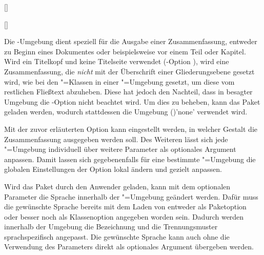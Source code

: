 \begin{Declaration*}{}
\begin{Declaration*}{}
\begin{Declaration*}{}
\begin{Declaration}{[]}
\begin{Declaration}{[]}
\begin{Declaration}{}
\begin{Declaration}[v2.02]{}
\begin{Declaration}[v2.02]{%
}
\begin{Declaration}{}
\begin{Declaration}{}{%
}
\printdeclarationlist%
%
%
Die -Umgebung dient speziell für die Ausgabe einer 
Zusammenfassung, entweder zu Beginn eines Dokumentes oder beispielsweise vor 
einem Teil oder Kapitel. Wird ein Titelkopf und keine Titelseite verwendet 
(\KOMAScript-Option ), wird eine Zusammenfassung, die 
\emph{nicht} mit der Überschrift einer Gliederungsebene gesetzt wird, wie bei 
den \KOMAScript"=Klassen in einer "=Umgebung gesetzt, um 
diese vom restlichen Fließtext abzuheben. Diese hat jedoch den Nachteil, dass 
in besagter Umgebung die \KOMAScript-Option  
nicht beachtet wird. Um dies zu beheben, kann das Paket  
geladen werden, wodurch stattdessen die Umgebung 
()'none' verwendet wird.

Mit der zuvor erläuterten Option  kann eingestellt werden, in 
welcher Gestalt die Zusammenfassung ausgegeben werden soll. Des Weiteren lässt 
sich jede "=Umgebung individuell über weitere Parameter 
als optionales Argument anpassen. Damit lassen sich gegebenenfalls für eine 
bestimmte "=Umgebung die globalen Einstellungen 
der Option  lokal ändern und gezielt anpassen. 

Wird das Paket  durch den Anwender geladen, kann mit dem 
optionalen Parameter  
die Sprache innerhalb der "=Umgebung geändert werden. 
Dafür muss die gewünschte Sprache bereits mit dem Laden von  
entweder als Paketoption oder besser noch als Klassenoption angegeben worden 
sein. Dadurch werden innerhalb der Umgebung die Bezeichnung  
und die Trennungsmuster sprachspezifisch angepasst. Die gewünschte Sprache kann 
auch ohne die Verwendung des Parameters  
direkt als optionales Argument übergeben werden.


\end{Declaration}
\end{Declaration}
\end{Declaration}
\end{Declaration}
\end{Declaration}
\end{Declaration}
\end{Declaration}
\end{Declaration*}
\end{Declaration*}
\end{Declaration*}
